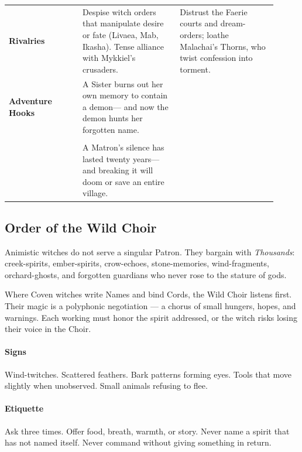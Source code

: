 \documentclass[11pt]{book}
\begin{document}
\begin{longtable}{p{0.25\linewidth} p{0.33\linewidth} p{0.33\linewidth}}
    \textbf{Rivalries} &
    Despise witch orders that manipulate desire or fate  
    (Livaea, Mab, Ikasha).  
    Tense alliance with Mykkiel's crusaders. &
    Distrust the Faerie courts and dream-orders;  
    loathe Malachai's Thorns, who twist confession into torment. \\
    
    \textbf{Adventure Hooks} &
    A Sister burns out her own memory to contain a demon---  
    and now the demon hunts her forgotten name.  
    \\
    &
    \\[-0.75em]
    &
    A Matron's silence has lasted twenty years---  
    and breaking it will doom or save an entire village. \\
    
    \bottomrule
    \end{longtable}
    \caption{Comparison of the Red Sisters of the Living Flame and the Silent Matrons of Light}
    
    
    \subsection*{Order of the Wild Choir}
    \label{order:wildchoir}
    
    Animistic witches do not serve a singular Patron.  
    They bargain with \emph{Thousands}: creek-spirits, ember-spirits, crow-echoes, stone-memories, wind-fragments, orchard-ghosts, and forgotten guardians who never rose to the stature of gods.  
    
    Where Coven witches write Names and bind Cords, the Wild Choir listens first.  
    Their magic is a polyphonic negotiation --- a chorus of small hungers, hopes, and warnings.  
    Each working must honor the spirit addressed, or the witch risks losing their voice in the Choir.
    
    \paragraph{Signs}
    Wind-twitches. Scattered feathers. Bark patterns forming eyes.  
    Tools that move slightly when unobserved. Small animals refusing to flee.
    
    \paragraph{Etiquette}
    Ask three times. Offer food, breath, warmth, or story.  
    Never name a spirit that has not named itself.  
    Never command without giving something in return.
    
\end{document}
